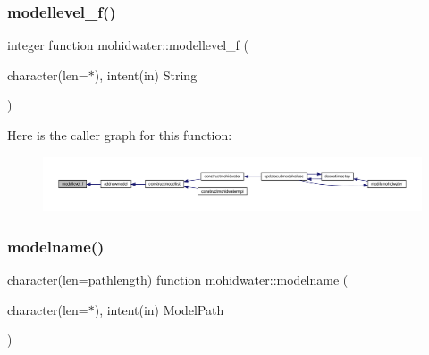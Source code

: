 \subsubsection{\texorpdfstring{modellevel\+\_\+f()}{modellevel\_f()}}
{\footnotesize\ttfamily integer function mohidwater\+::modellevel\+\_\+f (\begin{DoxyParamCaption}\item[{character(len=$\ast$), intent(in)}]{String }\end{DoxyParamCaption})}

Here is the caller graph for this function\+:\nopagebreak
\begin{figure}[H]
\begin{center}
\leavevmode
\includegraphics[width=350pt]{_main_8_f90_acdc3261ecd63c8e82b3392ec60df4db9_icgraph}
\end{center}
\end{figure}
\mbox{\label{_main_8_f90_af0ae0b978e6573bc461573aa66062e83}} 
\subsubsection{\texorpdfstring{modelname()}{modelname()}}
{\footnotesize\ttfamily character(len=pathlength) function mohidwater\+::modelname (\begin{DoxyParamCaption}\item[{character(len=$\ast$), intent(in)}]{Model\+Path }\end{DoxyParamCaption})}

